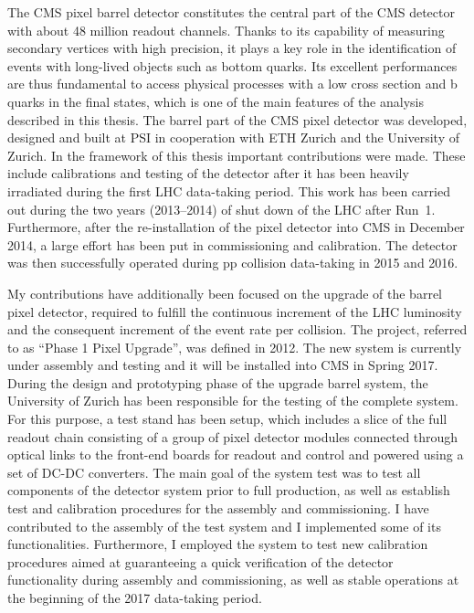 The CMS pixel barrel detector constitutes the central part of the CMS detector with about 48 million readout channels. Thanks to its capability of measuring secondary vertices with high precision,
it plays a key role in the identification of events with long-lived objects such as bottom quarks. 
Its excellent performances are thus fundamental to access physical processes with a low cross section and b quarks in the final states, which is one of the main features of the analysis described in this thesis.
The barrel part of the CMS pixel detector was developed, designed and built at PSI in cooperation with ETH Zurich and the University of Zurich.
In the framework of this thesis important contributions were made. These include calibrations and testing of the detector after it has been heavily irradiated during the first LHC data-taking period.
This work has been carried out during the two years (2013--2014) of shut down of the LHC after Run~1. Furthermore, after the re-installation of the pixel detector into CMS in December 2014,
a large effort has been put in commissioning and calibration. The detector was then successfully operated during pp collision data-taking in 2015 and 2016.

My contributions have additionally been focused on the upgrade of the barrel pixel detector, required to fulfill the continuous increment of the LHC luminosity and the consequent increment of the event rate per collision.
The project, referred to as ``Phase 1 Pixel Upgrade'', was defined in 2012. The new system is currently under assembly and testing and it will be installed into CMS in Spring 2017.
During the design and prototyping phase of the upgrade barrel system, the University of Zurich has been responsible for the testing of the complete system.
For this purpose, a test stand has been setup, which includes a slice of the full readout chain consisting of a group of pixel detector modules connected through optical links to the front-end boards for readout and control and powered using a set of DC-DC converters. The main goal of the system test was to test all components of the detector system prior to full production, as well as establish test and calibration procedures for the assembly and commissioning.
I have contributed to the assembly of the test system and I implemented some of its functionalities. Furthermore, I employed the system to test new calibration procedures
aimed at guaranteeing a quick verification of the detector functionality during assembly and commissioning, as well as stable operations at the beginning of the 2017 data-taking period.\\

